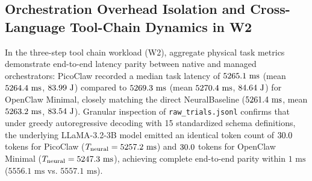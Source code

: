 \documentclass[preprint,12pt,3p]{elsarticle}
\begin{document}
\subsection{Orchestration Overhead Isolation and Cross-Language Tool-Chain Dynamics in W2}
In the three-step tool chain workload (W2), aggregate physical task metrics demonstrate end-to-end latency parity between native and managed orchestrators: PicoClaw recorded a median task latency of $5265.1\text{ ms}$ (mean $5264.4\text{ ms}$, $83.99\text{ J}$) compared to $5269.3\text{ ms}$ (mean $5270.4\text{ ms}$, $84.64\text{ J}$) for OpenClaw Minimal, closely matching the direct NeuralBaseline ($5261.4\text{ ms}$, mean $5263.2\text{ ms}$, $83.54\text{ J}$). Granular inspection of \texttt{raw\_trials.jsonl} confirms that under greedy autoregressive decoding with 15 standardized schema definitions, the underlying LLaMA-3.2-3B model emitted an identical token count of $30.0$ tokens for PicoClaw ($T_{\text{neural}} = 5257.2\text{ ms}$) and $30.0$ tokens for OpenClaw Minimal ($T_{\text{neural}} = 5247.3\text{ ms}$), achieving complete end-to-end parity within $1\text{ ms}$ ($5556.1\text{ ms}$ vs. $5557.1\text{ ms}$).
\end{document}
